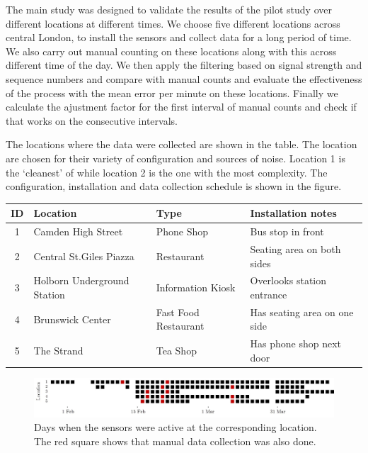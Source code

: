 The main study was designed to validate the results of the pilot study over different locations at different times. 
We choose five different locations across central London, to install the sensors and collect data for a long period of time. 
We also carry out manual counting on these locations along with this across different time of the day. 
We then apply the filtering based on signal strength and sequence numbers and compare with manual counts and evaluate the effectiveness of the process with the mean error per minute on these locations. 
Finally we calculate the ajustment factor for the first interval of manual counts and check if that works on the consecutive intervals. 

The locations where the data were collected are shown in the table. The location are chosen for their variety of configuration and sources of noise. Location 1 is the `cleanest' of while location 2 is the one with the most complexity. The configuration, installation and data collection schedule is shown in the figure. 

\begin{table}
	{\begin{tabular}{clll} 
		\toprule
		 ID & Location & Type & Installation notes\\
		 \midrule
		 1 & Camden High Street & Phone Shop & Bus stop in front\\
		 2 & Central St.Giles Piazza & Restaurant & Seating area on both sides\\
		 3 & Holborn Underground Station & Information Kiosk & Overlooks station entrance\\
		 4 & Brunswick Center & Fast Food Restaurant & Has seating area on one side\\
		 5 & The Strand & Tea Shop & Has phone shop next door \\
		 \bottomrule
	\end{tabular}}
	\label{locations-table}
\end{table}

\begin{figure}
	\begin{center}
		\includegraphics [width=0.90\linewidth] {images/main_schedule.jpeg}
		\caption{Days when the sensors were active at the corresponding location. The red square shows that manual data collection was also done.}
		\label{pilot_clustering}
	\end{center}
\end{figure}

